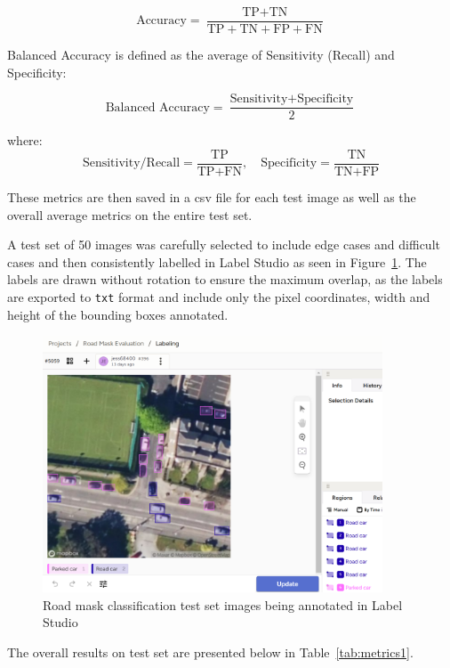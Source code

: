 \[
\text{Accuracy} = \frac{\text{TP} + \text{TN}}{\text{TP} + \text{TN} + \text{FP} + \text{FN}}
\]

Balanced Accuracy is defined as the average of Sensitivity (Recall) and Specificity:

\[
\text{Balanced Accuracy} = \frac{\text{Sensitivity} + \text{Specificity}}{2}
\]

where:
\[
\text{Sensitivity/Recall} = \frac{\text{TP}}{\text{TP} + \text{FN}}, \quad
\text{Specificity} = \frac{\text{TN}}{\text{TN} + \text{FP}}
\]

These metrics are then saved in a csv file for each test image as well as the overall average metrics on the entire test set.

A test set of 50 images was carefully selected to include edge cases and difficult cases and then consistently labelled in Label Studio as seen in Figure~\ref{fig:LabelStudio_test_set}. The labels are drawn without rotation to ensure the maximum overlap, as the labels are exported to \texttt{txt} format and include only the pixel coordinates, width and  height of the bounding boxes annotated.

\begin{figure}[htbp]
    \centering
    \includegraphics[width=0.9\textwidth]{images/label_studio4.png}
    \caption{Road mask classification test set images being annotated in Label Studio}
    \label{fig:LabelStudio_test_set}
\end{figure}

\newpage{}


The overall results on test set are presented below in Table~\ref{tab:metrics1}.

